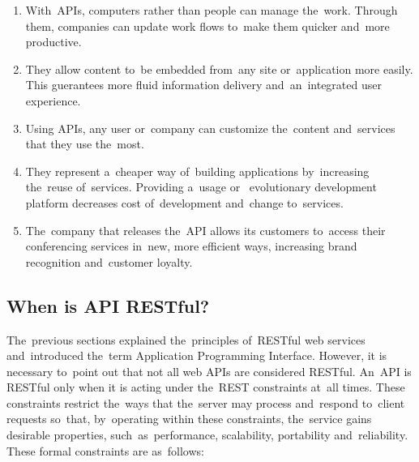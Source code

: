 \begin{enumerate}
  \item With~APIs, computers rather than people can manage the~work. Through
  them, companies can update work flows to~make them quicker and~more
  productive.
  \item They allow content to~be embedded from~any site or~application more
  easily. This guerantees more fluid information delivery and~an~integrated user
  experience.
  \item Using APIs, any user or~company can customize the~content and~services
  that they use the~most.
  \item They represent a~cheaper way of~building applications by~increasing
  the~reuse of~services. Providing a~usage or~ evolutionary
  development platform decreases cost of~development and~change to~services.
  \item The~company that releases the~API allows its customers to~access their
  conferencing services in~new, more efficient ways, increasing brand
  recognition and~customer loyalty.
\end{enumerate}


\subsection{When is API RESTful?}
The~previous sections explained the~principles of~RESTful web services
and~introduced the~term Application Programming Interface. However, it is
necessary to~point out that not all web APIs are considered RESTful. An~API is
RESTful only when it is acting under the~REST constraints at~all times. These
constraints restrict the~ways that the~server may process and~respond to~client
requests so~that, by~operating within these constraints, the~service gains
desirable  properties, such~as~performance, scalability,
portability and~reliability. These formal constraints are as~follows:

